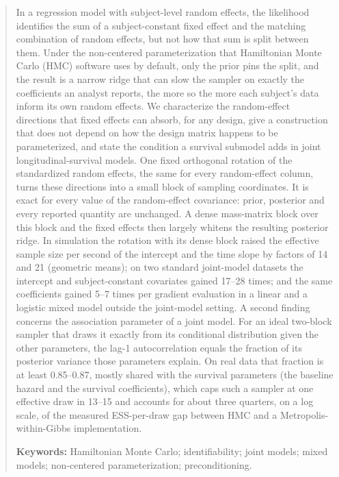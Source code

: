 \begin{abstract}
\noindent
In a regression model with subject-level random effects, the likelihood
identifies the sum of a subject-constant fixed effect and the matching
combination of random effects, but not how that sum is split between them.
Under the non-centered parameterization that Hamiltonian Monte Carlo (HMC)
software uses by default, only the prior pins the split, and the result is
a narrow ridge that can slow the sampler on exactly the coefficients an analyst reports, the more so the more each subject's data inform its own random effects. We characterize the random-effect directions that fixed
effects can absorb, for any design, give a construction that does not
depend on how the design matrix happens to be parameterized, and state the
condition a survival submodel adds in joint longitudinal-survival models.
One fixed orthogonal rotation of the standardized random effects, the same
for every random-effect column, turns these directions into a small block
of sampling coordinates. It is exact for every value of the random-effect
covariance: prior, posterior and every reported quantity are unchanged. A
dense mass-matrix block over this block and the fixed effects then largely whitens the resulting posterior ridge. In simulation the rotation with its dense block raised the effective sample size per
second of the intercept and the time slope by factors of 14 and 21
(geometric means); on two standard joint-model datasets the intercept and
subject-constant covariates gained 17--28 times; and the same coefficients
gained 5--7 times per gradient evaluation in a linear and a logistic mixed
model outside the joint-model setting. A second finding concerns the association parameter of a joint
model. For an ideal two-block sampler that draws it exactly from its
conditional distribution given the other parameters, the lag-1
autocorrelation equals the fraction of its posterior variance those
parameters explain. On real data that fraction is at least 0.85--0.87,
mostly shared with the survival parameters (the baseline hazard and the survival coefficients), which caps such a sampler at one effective draw in 13--15 and accounts for about three quarters, on a log scale, of the measured ESS-per-draw gap between HMC and a Metropolis-within-Gibbs implementation.

\medskip\noindent
\textbf{Keywords:} Hamiltonian Monte Carlo; identifiability; joint models;
mixed models; non-centered parameterization; preconditioning.
\end{abstract}

